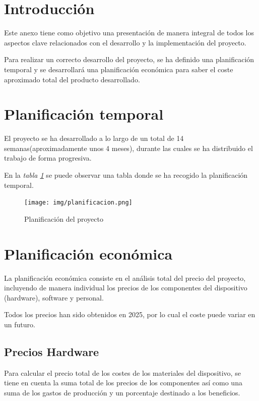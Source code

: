 \section{Introducción}
Este anexo tiene como objetivo una presentación de manera integral de todos los aspectos clave relacionados con el desarrollo y la implementación del proyecto. 

Para realizar un correcto desarrollo del proyecto, se ha definido una planificación temporal y se desarrollará una planificación económica para saber el coste aproximado total del producto desarrollado.
\section{Planificación temporal}
El proyecto se ha desarrollado a lo largo de un total de 14 semanas(aproximadamente unos 4 meses), durante las cuales se ha distribuido el trabajo de forma progresiva. 

En la \textit{tabla \ref{fig:Planificación}} se puede observar una tabla donde se ha recogido la planificación temporal.
\begin{figure}[h]
        \centering
        \texttt{[image: img/planificacion.png]}
        \caption{Planificación del proyecto}
        \label{fig:Planificación}
    \end{figure}

\section{Planificación económica}

La planificación económica consiste en el análisis total del precio del proyecto, incluyendo de manera individual los precios de los componentes del dispositivo (hardware), software y personal.

Todos los precios han sido obtenidos en 2025, por lo cual el coste puede variar en un futuro. 
\subsection{Precios Hardware}
Para calcular el precio total de los costes de los materiales del dispositivo, se tiene en cuenta la suma total de los precios de los componentes así como una suma de los gastos de producción y un porcentaje destinado a los beneficios. 

